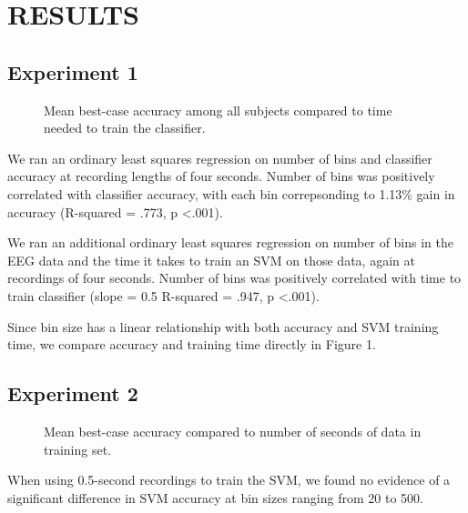 \section{\uppercase{Results}}

\subsection{Experiment 1}

\begin{figure}[!h]
  \vspace{-0.2cm}
  \centering
   {}
  \caption{Mean best-case accuracy among all subjects compared to time needed to train the classifier.}
  \label{fig:fig1}
  \vspace{-0.1cm}
 \end{figure}

We ran an ordinary least squares regression on number of bins and classifier accuracy at recording lengths of four seconds. Number of bins was positively correlated with classifier accuracy, with each bin correpsonding to 1.13\% gain in accuracy (R-squared = .773, p \textless .001). 

We ran an additional ordinary least squares regression on number of bins in the EEG data and the time it takes to train an SVM on those data, again at recordings of four seconds. Number of bins was positively correlated with time to train classifier (slope = 0.5 R-squared = .947, p \textless .001).

Since bin size has a linear relationship with both accuracy and SVM training time, we compare accuracy and training time directly in Figure 1.

\subsection{Experiment 2}

\begin{figure}[!h]
  \vspace{-0.2cm}
  \centering
   {}
  \caption{Mean best-case accuracy compared to number of seconds of data in training set.}
  \label{fig:fig2}
  \vspace{-0.1cm}
\end{figure}

When using 0.5-second recordings to train the SVM, we found no evidence of a significant difference in SVM accuracy at bin sizes ranging from 20 to 500.

